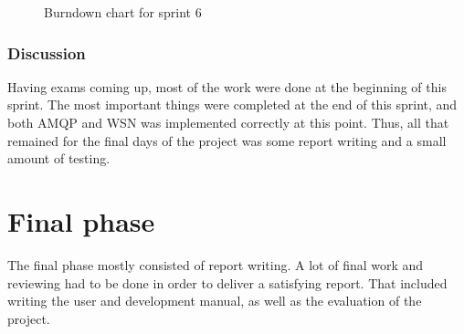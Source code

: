 \begin{center}
  \begin{figure}[ht!]
    \caption{Burndown chart for sprint 6}
    \label{fig:sprint 6, burndown}
  \end{figure}
\end{center}

\subsubsection{Discussion}
\label{subsec:project_lifecycle-development-sprint_6-discussion}

Having exams coming up, most of the work were done at the beginning of this sprint. The most important things were completed at the end of this sprint, and both AMQP and WSN was implemented correctly at this point. Thus, all that remained for the final days of the project was some report writing and a small amount of testing. 

\section{Final phase}

The final phase mostly consisted of report writing. A lot of final work and reviewing had to be done in order to deliver a satisfying report. That included writing the user and development manual, as well as the evaluation of the project.


